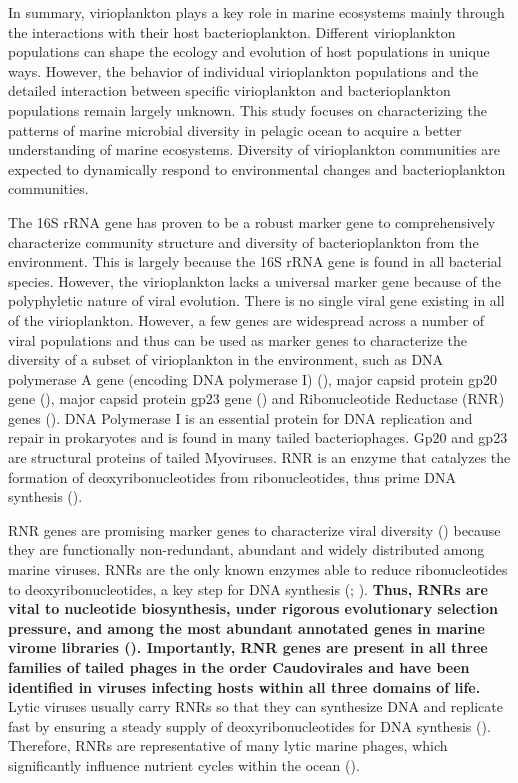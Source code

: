 \documentclass[a4,center,fleqn]{NAR}
\begin{document}
In summary, virioplankton plays a key role in marine ecosystems mainly through the interactions with their host bacterioplankton. 
Different virioplankton populations can shape the ecology and evolution of host populations in unique ways. 
However, the behavior of individual virioplankton populations and the detailed interaction between specific virioplankton and bacterioplankton populations remain largely unknown. 
This study focuses on characterizing the patterns of marine microbial diversity in pelagic ocean to acquire a better understanding of marine ecosystems. 
Diversity of virioplankton communities are expected to dynamically respond to environmental changes and bacterioplankton communities.

The 16S rRNA gene has proven to be a robust marker gene to comprehensively characterize community structure and diversity of bacterioplankton from the environment. 
This is largely because the 16S rRNA gene is found in all bacterial species.  
However, the virioplankton lacks a universal marker gene because of the polyphyletic nature of viral evolution. 
There is no single viral gene existing in all of the virioplankton. 
However, a few genes are widespread across a number of viral populations and thus can be used as marker genes to characterize the diversity of a subset of virioplankton in the environment, such as DNA polymerase A gene (encoding DNA polymerase I) (\cite{Schmidt2014}), major capsid protein gp20 gene (\cite{Zhong2002}), major capsid protein gp23 gene (\cite{Comeau2008}) and Ribonucleotide Reductase (RNR) genes (\cite{Sakowski2014}). 
DNA Polymerase I is an essential protein for DNA replication and repair in prokaryotes and is found in many tailed bacteriophages. 
Gp20 and gp23 are structural proteins of tailed Myoviruses.
RNR is an enzyme that catalyzes the formation of deoxyribonucleotides from ribonucleotides, thus prime DNA synthesis (\cite{ELLEDGE1992119}).


RNR genes are promising marker genes to characterize viral diversity (\cite{Sakowski2014}) because they are functionally non-redundant, abundant and widely distributed among marine viruses. 
RNRs are the only known enzymes able to reduce ribonucleotides to deoxyribonucleotides, a key step for DNA synthesis (\cite{Lundin2010}; \cite{ELLEDGE1992119}). 
\textbf{Thus, RNRs are vital to nucleotide biosynthesis, under rigorous evolutionary selection pressure, and among the most abundant annotated genes in marine virome libraries (\cite{Dwivedi2013}). 
Importantly, RNR genes are present in all three families of tailed phages in the order Caudovirales and have been identified in viruses infecting hosts within all three domains of life.}
Lytic viruses usually carry RNRs so that they can synthesize DNA and replicate fast by ensuring a steady supply of deoxyribonucleotides for DNA synthesis (\cite{Sullivan2005}). 
Therefore, RNRs are  representative of many lytic marine phages, which significantly influence nutrient cycles within the ocean (\cite{Brussaard2008}). 
 
\end{document}
